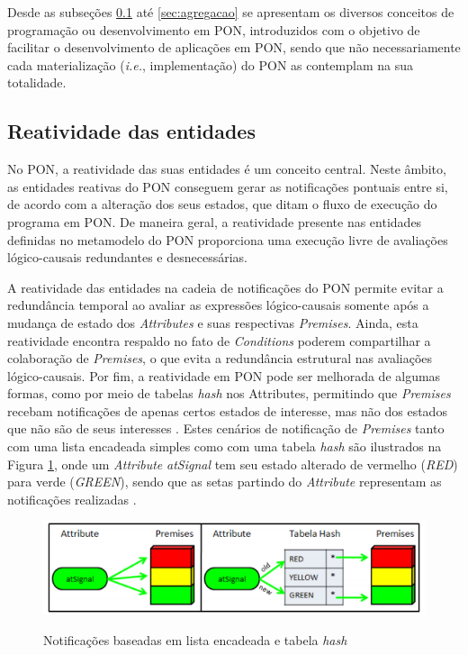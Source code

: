 Desde as subseções \ref{sec:reatividade} até \ref{sec:agregacao} se apresentam
os diversos conceitos de programação ou desenvolvimento em PON, introduzidos com
o objetivo de facilitar o desenvolvimento de aplicações em PON, sendo que não
necessariamente cada materialização (\textit{i.e.}, implementação) do PON as
contemplam na sua totalidade.

\subsection{Reatividade das entidades}\label{sec:reatividade}

No PON, a reatividade das suas entidades é um conceito central. Neste âmbito, as
entidades reativas do PON conseguem gerar as notificações pontuais entre si, de
acordo com a alteração dos seus estados, que ditam o fluxo de execução do
programa em PON. De maneira geral, a reatividade presente nas entidades
definidas no metamodelo do PON proporciona uma execução livre de avaliações
lógico-causais redundantes e desnecessárias. 

A reatividade das entidades na cadeia de notificações do PON permite evitar a
redundância temporal ao avaliar as expressões lógico-causais somente após a
mudança de estado dos \textit{Attributes} e suas respectivas \textit{Premises}.
Ainda, esta reatividade encontra respaldo no fato de \textit{Conditions} poderem
compartilhar a colaboração de \textit{Premises}, o que evita a redundância
estrutural nas avaliações lógico-causais. Por fim, a reatividade em PON pode ser
melhorada de algumas formas, como por meio de tabelas \textit{hash} nos
Attributes, permitindo que \textit{Premises} recebam notificações de apenas
certos estados de interesse, mas não dos estados que não são de seus interesses
\cite{msc_Banaszewski_2009}. Estes cenários de notificação de \textit{Premises}
tanto com uma lista encadeada simples como com uma tabela \textit{hash} são
ilustrados na Figura \ref{fig:hash_not}, onde um \textit{Attribute}
\textit{atSignal} tem seu estado alterado de vermelho (\textit{RED}) para verde
(\textit{GREEN}), sendo que as setas partindo do \textit{Attribute} representam
as notificações realizadas \cite{msc_Banaszewski_2009}.

\begin{figure}[!htb]
  \centering
  \caption{Notificações baseadas em lista encadeada e tabela \textit{hash}}
  \includegraphics[width=\textwidth]{../figures/hash_not.png}
  \smallskip
  \label{fig:hash_not}
\end{figure}


